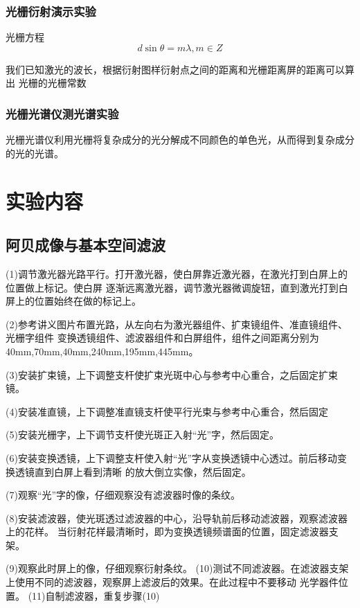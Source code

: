 \documentclass[12pt,a4paper]{article}
\begin{document}
        \subsubsection{光栅衍射演示实验}
        光栅方程
        \begin{equation}
            d\sin \theta  = m\lambda ,m \in Z
        \end{equation}

        我们已知激光的波长，根据衍射图样衍射点之间的距离和光栅距离屏的距离可以算出
        光栅的光栅常数

        \subsubsection{光栅光谱仪测光谱实验}
        光栅光谱仪利用光栅将复杂成分的光分解成不同颜色的单色光，从而得到复杂成分的光的光谱。

    \section{实验内容}
    \subsection{阿贝成像与基本空间滤波}
    (1)调节激光器光路平行。打开激光器，使白屏靠近激光器，在激光打到白屏上的位置做上标记。使白屏
    逐渐远离激光器，调节激光器微调旋钮，直到激光打到白屏上的位置始终在做的标记上。\par
    (2)参考讲义图片布置光路，从左向右为激光器组件、扩束镜组件、准直镜组件、光栅字组件
    变换透镜组件、滤波器组件和白屏组件，组件之间距离分别为40mm,70mm,40mm,240mm,195mm,445mm。\par
    (3)安装扩束镜，上下调整支杆使扩束光斑中心与参考中心重合，之后固定扩束镜。\par
    (4)安装准直镜，上下调整准直镜支杆使平行光束与参考中心重合，然后固定\par
    (5)安装光栅字，上下调节支杆使光斑正入射“光”字，然后固定。\par
    (6)安装变换透镜，上下调整支杆使入射“光”字从变换透镜中心透过。前后移动变换透镜直到白屏上看到清晰
    的放大倒立实像，然后固定。\par
    (7)观察“光”字的像，仔细观察没有滤波器时像的条纹。\par
    (8)安装滤波器，使光斑透过滤波器的中心，沿导轨前后移动滤波器，观察滤波器上的花样。
    当衍射花样最清晰时，即为变换透镜频谱面的位置，固定滤波器支架。\par
    (9)观察此时屏上的像，仔细观察衍射条纹。
    (10)测试不同滤波器。在滤波器支架上使用不同的滤波器，观察屏上滤波后的效果。在此过程中不要移动
    光学器件位置。
    (11)自制滤波器，重复步骤(10)
\end{document}
